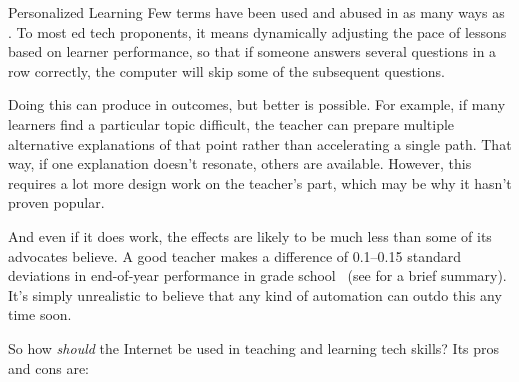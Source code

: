 \begin{aside}{Personalized Learning}
  Few terms have been used and abused in as many ways
  as .
  To most ed tech proponents,
  it means dynamically adjusting the pace of lessons based on learner performance,
  so that if someone answers several questions in a row correctly,
  the computer will skip some of the subsequent questions.

  Doing this can produce
   in outcomes,
  but better is possible.
  For example,
  if many learners find a particular topic difficult,
  the teacher can prepare multiple alternative explanations of that point
  rather than accelerating a single path.
  That way,
  if one explanation doesn't resonate,
  others are available.
  However,
  this requires a lot more design work on the teacher's part,
  which may be why it hasn't proven popular.

  And even if it does work,
  the effects are likely to be much less than some of its advocates believe.
  A good teacher makes a difference of 0.1--0.15 standard deviations in end-of-year performance in grade school~\cite{Chet2014}
  (see  for a brief summary).
  It's simply unrealistic to believe that any kind of automation can outdo this any time soon.
\end{aside}

So how \emph{should} the Internet be used in teaching and learning tech skills?
Its pros and cons are:

